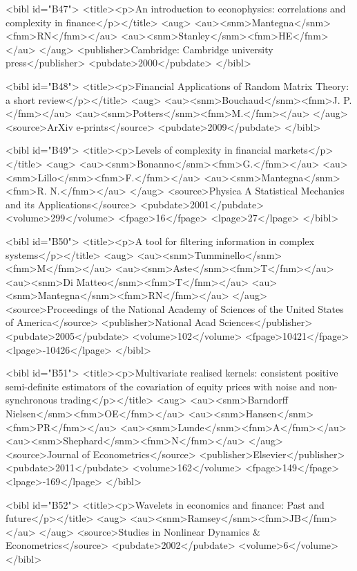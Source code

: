 \documentclass{bmcart}
\begin{document}
\begin{backmatter}
{<bibl id="B47">
  <title><p>An introduction to econophysics: correlations and complexity in
  finance</p></title>
  <aug>
    <au><snm>Mantegna</snm><fnm>RN</fnm></au>
    <au><snm>Stanley</snm><fnm>HE</fnm></au>
  </aug>
  <publisher>Cambridge: Cambridge university press</publisher>
  <pubdate>2000</pubdate>
</bibl>

<bibl id="B48">
  <title><p>{Financial Applications of Random Matrix Theory: a short
  review}</p></title>
  <aug>
    <au><snm>{Bouchaud}</snm><fnm>J. P.</fnm></au>
    <au><snm>{Potters}</snm><fnm>M.</fnm></au>
  </aug>
  <source>ArXiv e-prints</source>
  <pubdate>2009</pubdate>
</bibl>

<bibl id="B49">
  <title><p>{Levels of complexity in financial markets}</p></title>
  <aug>
    <au><snm>{Bonanno}</snm><fnm>G.</fnm></au>
    <au><snm>{Lillo}</snm><fnm>F.</fnm></au>
    <au><snm>{Mantegna}</snm><fnm>R. N.</fnm></au>
  </aug>
  <source>Physica A Statistical Mechanics and its Applications</source>
  <pubdate>2001</pubdate>
  <volume>299</volume>
  <fpage>16</fpage>
  <lpage>27</lpage>
</bibl>

<bibl id="B50">
  <title><p>A tool for filtering information in complex systems</p></title>
  <aug>
    <au><snm>Tumminello</snm><fnm>M</fnm></au>
    <au><snm>Aste</snm><fnm>T</fnm></au>
    <au><snm>Di Matteo</snm><fnm>T</fnm></au>
    <au><snm>Mantegna</snm><fnm>RN</fnm></au>
  </aug>
  <source>Proceedings of the National Academy of Sciences of the United States
  of America</source>
  <publisher>National Acad Sciences</publisher>
  <pubdate>2005</pubdate>
  <volume>102</volume>
  <fpage>10421</fpage>
  <lpage>-10426</lpage>
</bibl>

<bibl id="B51">
  <title><p>Multivariate realised kernels: consistent positive semi-definite
  estimators of the covariation of equity prices with noise and non-synchronous
  trading</p></title>
  <aug>
    <au><snm>Barndorff Nielsen</snm><fnm>OE</fnm></au>
    <au><snm>Hansen</snm><fnm>PR</fnm></au>
    <au><snm>Lunde</snm><fnm>A</fnm></au>
    <au><snm>Shephard</snm><fnm>N</fnm></au>
  </aug>
  <source>Journal of Econometrics</source>
  <publisher>Elsevier</publisher>
  <pubdate>2011</pubdate>
  <volume>162</volume>
  <fpage>149</fpage>
  <lpage>-169</lpage>
</bibl>

<bibl id="B52">
  <title><p>Wavelets in economics and finance: Past and future</p></title>
  <aug>
    <au><snm>Ramsey</snm><fnm>JB</fnm></au>
  </aug>
  <source>Studies in Nonlinear Dynamics \& Econometrics</source>
  <pubdate>2002</pubdate>
  <volume>6</volume>
</bibl>

}
\end{backmatter}
\end{document}

